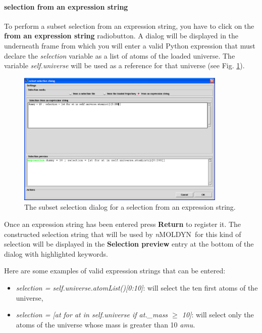 \documentclass[a4paper,11pt]{report}
\newcommand{\amu}{\textit{amu}}
\newcommand{\NMOLDYN}{\textit{n}MOLDYN}
\begin{document}
\paragraph{selection from an expression string\\}
To perform a subset selection from an expression string, you have to click on the \textbf{from an expression string} 
radiobutton. A dialog will be displayed in the underneath frame from which you will enter a valid Python expression 
that must declare the \textit{selection} variable as a list of atoms of the loaded universe. The variable 
\textit{self.universe} will be used as a reference for that universe (see Fig. \ref{fig:subset_selection_from_an_expression_string}).
\begin{figure}[h!]
\begin{center}
\includegraphics[width=10cm]{Figures/subset_selection_from_an_expression_string.eps}
\end{center}
\caption[The subset selection dialog for a selection from an expression string]{The subset selection dialog for a selection from an expression string.}
\label{fig:subset_selection_from_an_expression_string}
\end{figure}   

Once an expression string has been entered press \textbf{Return} to register it. The constructed selection string that will be used by \NMOLDYN\ for this kind of 
selection will be displayed in the \textbf{Selection preview} entry at the bottom of the dialog with highlighted keywords.

Here are some examples of valid expression strings that can be entered:
\begin{itemize}
\item \textit{selection = self.universe.atomList()[0:10]}: will select the ten first atoms of the universe,
\item \textit{selection = [at for at in self.universe if at.\_mass $\geq$ 10]}: will select only the atoms of the universe whose 
mass is greater than 10 \amu .
\end{itemize}
\newpage
\end{document}
